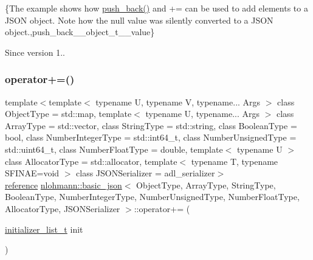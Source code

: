 \{The example shows how {\ttfamily \mbox{\hyperlink{classnlohmann_1_1basic__json_ac8e523ddc8c2dd7e5d2daf0d49a9c0d7}{push\+\_\+back()}}} and {\ttfamily +=} can be used to add elements to a J\+S\+ON object. Note how the {\ttfamily null} value was silently converted to a J\+S\+ON object.,push\+\_\+back\+\_\+\+\_\+object\+\_\+t\+\_\+\+\_\+value\}

\begin{DoxySince}{Since}
version 1.. 
\end{DoxySince}
\mbox{\label{classnlohmann_1_1basic__json_af245c2b6714d76ed99a2d02f2596d596}} 
\subsubsection{\texorpdfstring{operator+=()}{operator+=()}\hspace{0.1cm}{\footnotesize\ttfamily [4/4]}}
{\footnotesize\ttfamily template$<$template$<$ typename U, typename V, typename... Args $>$ class Object\+Type = std\+::map, template$<$ typename U, typename... Args $>$ class Array\+Type = std\+::vector, class String\+Type  = std\+::string, class Boolean\+Type  = bool, class Number\+Integer\+Type  = std\+::int64\+\_\+t, class Number\+Unsigned\+Type  = std\+::uint64\+\_\+t, class Number\+Float\+Type  = double, template$<$ typename U $>$ class Allocator\+Type = std\+::allocator, template$<$ typename T, typename S\+F\+I\+N\+A\+E=void $>$ class J\+S\+O\+N\+Serializer = adl\+\_\+serializer$>$ \\
\mbox{\hyperlink{classnlohmann_1_1basic__json_ac6a5eddd156c776ac75ff54cfe54a5bc}{reference}} \mbox{\hyperlink{classnlohmann_1_1basic__json}{nlohmann\+::basic\+\_\+json}}$<$ Object\+Type, Array\+Type, String\+Type, Boolean\+Type, Number\+Integer\+Type, Number\+Unsigned\+Type, Number\+Float\+Type, Allocator\+Type, J\+S\+O\+N\+Serializer $>$\+::operator+= (\begin{DoxyParamCaption}\item[{\mbox{\hyperlink{classnlohmann_1_1basic__json_ad70a098fbc01c53497db29d3b5b656a9}{initializer\+\_\+list\+\_\+t}}}]{init }\end{DoxyParamCaption})\hspace{0.3cm}{\ttfamily [inline]}}



